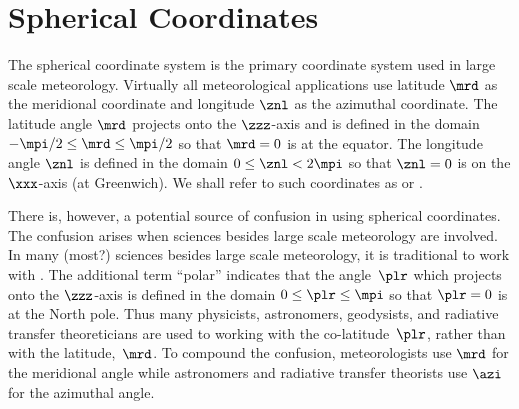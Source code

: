\documentclass[12pt,twoside]{book}
\begin{document}
\section[Spherical Coordinates]{Spherical Coordinates}\label{sxn:sph}
The spherical coordinate system is the primary coordinate system used
in large scale meteorology.
Virtually all meteorological applications use latitude $\mrd$ as the 
meridional coordinate and longitude $\znl$ as the azimuthal
coordinate. 
The latitude angle $\mrd$ projects onto the $\zzz$-axis and is defined
in the domain $-\mpi/2 \le \mrd \le \mpi/2$ so that $\mrd = 0$ is at the
equator.
The longitude angle $\znl$ is defined in the domain $0 \le \znl <
2\mpi$ so that $\znl = 0$ is on the $\xxx$-axis (at Greenwich).
We shall refer to such coordinates as 
or .

There is, however, a potential source of confusion in using spherical  
coordinates. 
The confusion arises when sciences besides large scale meteorology
are involved.
In many (most?) sciences besides large scale meteorology, it is
traditional to work with .
The additional term ``polar'' indicates that the angle~$\plr$
which projects onto the $\zzz$-axis is defined in the domain 
$0 \le \plr \le \mpi$ so that $\plr = 0$ is at the North pole.
Thus many physicists, astronomers, geodysists, and radiative transfer 
theoreticians are used to working with the co-latitude~$\plr$, rather
than with the latitude,~$\mrd$.
To compound the confusion, meteorologists use $\mrd$ for the
meridional angle while astronomers and radiative transfer theorists
use $\azi$ for the azimuthal angle.
\end{document}
